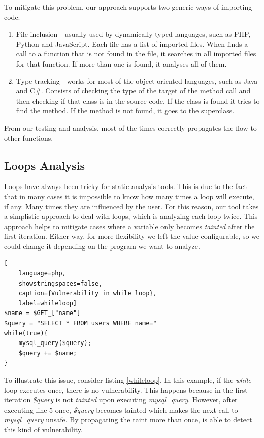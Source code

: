 To mitigate this problem, our approach supports two generic ways of importing code:
\begin{enumerate}
    \item File inclusion - usually used by dynamically typed languages, such as PHP, Python and JavaScript. Each file has a list of imported files. When \toolname{} finds a call to a function that is not found in the file, it searches in all imported files for that function. If more than one is found, it analyses all of them.
    
    \item Type tracking - works for most of the object-oriented languages, such as Java and C\#. Consists of checking the type of the target of the method call and then checking if that class is in the source code. If the class is found it tries to find the method. If the method is not found, it goes to the superclass.
\end{enumerate}

From our testing and analysis, most of the times \toolname{} correctly propagates the flow to other functions.


\subsection{Loops Analysis}
\label{loops}
Loops have always been tricky for static analysis tools. This is due to the fact that in many cases it is impossible to know how many times a loop will execute, if any. Many times they are influenced by the user. For this reason, our tool takes a simplistic approach to deal with loops, which is analyzing each loop twice. This approach helps to mitigate cases where a variable only becomes \textit{tainted} after the first iteration. Either way, for more flexibility we left the value configurable, so we could change it depending on the program we want to analyze. 


\begin{lstlisting}[
    language=php,
    showstringspaces=false,
    caption={Vulnerability in while loop},
    label=whileloop] 
$name = $GET_["name"]    
$query = "SELECT * FROM users WHERE name=" 
while(true){
    mysql_query($query);
    $query += $name;
}
\end{lstlisting}

To illustrate this issue, consider listing \ref{whileloop}. In this example, if the \textit{while} loop executes once, there is no vulnerability. This happens because in the first iteration \textit{\$query} is not \textit{tainted} upon executing \textit{mysql\_query}. However, after executing line 5 once, \textit{\$query} becomes tainted which makes the next call to \textit{mysql\_query} unsafe. By propagating the taint more than once, \toolname{} is able to detect this kind of vulnerability.


